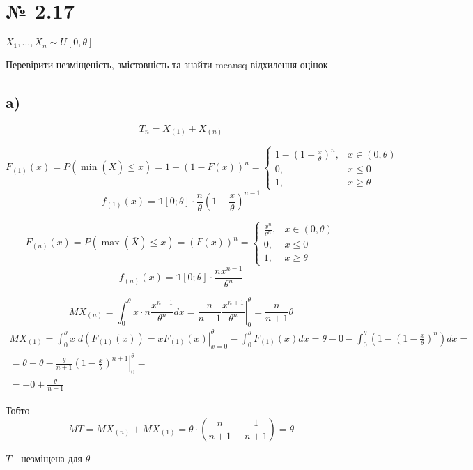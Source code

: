 \documentclass[11pt, a4paper]{article} %
\begin{document}

\section*{№ 2.17}
\begin{mdframed}
    $X_1, ..., X_n \sim U[0,\theta]$

    Перевірити незміщеність, змістовність та знайти meansq відхилення оцінок
\end{mdframed}
\subsection*{a)}
$$T_n = X_{(1)} + X_{(n)}$$

$$F_{(1)}(x) = P(\min(\overline X) \le x) = 1 - \left(1 - F(x)\right)^n = \begin{cases}
    1 - (1-\frac{x}{\theta})^n, & x \in (0, \theta) \\
    0, & x \le 0 \\
    1, & x \ge \theta
\end{cases} $$
$$f_{(1)}(x) = \mathbb{1}[0;\theta] \cdot \frac{n}{\theta} (1-\frac{x}{\theta})^{n-1}$$

$$F_{(n)}(x) = P(\max(\overline X) \le x) = \left(F(x)\right)^n = \begin{cases}
   \frac{x^n}{\theta^n}, & x \in (0, \theta) \\
    0, & x \le 0 \\
    1, & x \ge \theta
\end{cases} $$
$$f_{(n)}(x) = \mathbb{1}[0;\theta] \cdot \frac{nx^{n-1}}{\theta^n}$$


$$MX_{(n)} = \int_0^\theta x \cdot n\frac{x^{n-1}}{\theta^n} dx = \left. \frac{n}{n+1} \frac{x^{n+1}}{\theta^n} \right|_0^\theta = \frac{n}{n+1}\theta$$
\begin{multline*}
    MX_{(1)} = \int_0^\theta x \; d \left( F_{(1)}(x) \right) = 
    \left.x F_{(1)}(x)\right|_{x=0}^\theta - \int_0^\theta F_{(1)}(x) dx
    = \theta  - 0 - \int_0^\theta \left(1 - (1-\frac{x}{\theta})^n\right) dx = \\
    = \theta - \theta - \frac{\theta}{n+1} \left.\left(1-\frac{x}{\theta}\right)^{n+1}\right|_0^\theta = \\
    = - 0 + \frac{\theta}{n+1}
\end{multline*}

Тобто $$MT = MX_{(n)} + MX_{(1)} = \theta \cdot \left(\frac{n}{n+1} + \frac{1}{n+1}\right) = \theta$$
\begin{mdframed}[style=ans]
    $T$ - незміщена для $\theta$
\end{mdframed}
\end{document}
